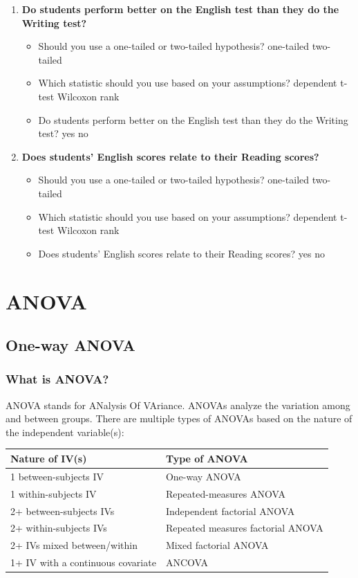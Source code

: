 \documentclass[
]{book}
\begin{document}
\begin{enumerate}
\def\labelenumi{\arabic{enumi}.}
\item
  \textbf{Do students perform better on the English test than they do the Writing test?}

  \begin{itemize}
  \item
    Should you use a one-tailed or two-tailed hypothesis? one-tailed two-tailed
  \item
    Which statistic should you use based on your assumptions? dependent t-test Wilcoxon rank
  \item
    Do students perform better on the English test than they do the Writing test? yes no
  \end{itemize}
\item
  \textbf{Does students' English scores relate to their Reading scores?}

  \begin{itemize}
  \item
    Should you use a one-tailed or two-tailed hypothesis? one-tailed two-tailed
  \item
    Which statistic should you use based on your assumptions? dependent t-test Wilcoxon rank
  \item
    Does students' English scores relate to their Reading scores? yes no
  \end{itemize}
\end{enumerate}

\hypertarget{part-anova}{%
\part{ANOVA}\label{part-anova}}

\hypertarget{one-way-anova}{%
\chapter{One-way ANOVA}\label{one-way-anova}}

\hypertarget{what-is-anova}{%
\section{What is ANOVA?}\label{what-is-anova}}

ANOVA stands for ANalysis Of VAriance. ANOVAs analyze the variation among and between groups. There are multiple types of ANOVAs based on the nature of the independent variable(s):

\begin{longtable}[]{@{}ll@{}}
\toprule
\textbf{Nature of IV(s)} & \textbf{Type of ANOVA}\tabularnewline
\midrule
\endhead
1 between-subjects IV & One-way ANOVA\tabularnewline
1 within-subjects IV & Repeated-measures ANOVA\tabularnewline
2+ between-subjects IVs & Independent factorial ANOVA\tabularnewline
2+ within-subjects IVs & Repeated measures factorial ANOVA\tabularnewline
2+ IVs mixed between/within & Mixed factorial ANOVA\tabularnewline
1+ IV with a continuous covariate & ANCOVA\tabularnewline
\bottomrule
\end{longtable}
\end{document}
